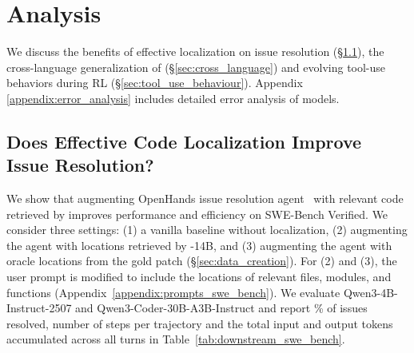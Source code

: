\section{Analysis}
We discuss the benefits of effective localization on issue resolution (\S\ref{sec:downstream_swebench}), the cross-language generalization of \methodname (\S\ref{sec:cross_language}) and evolving tool-use behaviors during RL (\S\ref{sec:tool_use_behaviour}). Appendix \ref{appendix:error_analysis} includes detailed error analysis of \methodname models.



\subsection{Does Effective Code Localization Improve Issue Resolution?}\label{sec:downstream_swebench}

We show that augmenting OpenHands issue resolution agent~\citep{wang2025openhandssoftwareagentsdk} with relevant code retrieved by \methodname improves performance and efficiency on SWE-Bench Verified. We consider three settings: (1) a vanilla baseline without localization, (2) augmenting the agent with locations retrieved by \methodname-14B, and (3) augmenting the agent with oracle locations from the gold patch (\S\ref{sec:data_creation}). 
For (2) and (3), the user prompt is modified to include the locations of relevant files, modules, and functions (Appendix~\ref{appendix:prompts_swe_bench}). We evaluate Qwen3-4B-Instruct-2507 and Qwen3-Coder-30B-A3B-Instruct and report \% of issues resolved, number of steps per trajectory and the total input and output tokens accumulated across all turns in Table~\ref{tab:downstream_swe_bench}.
  
